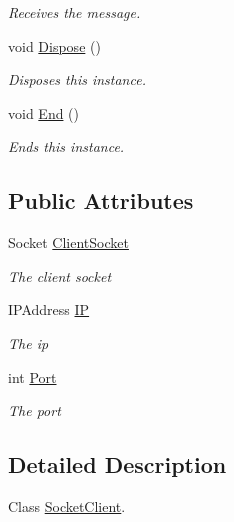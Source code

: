 \begin{DoxyCompactItemize}
\begin{DoxyCompactList}\small\item\em Receives the message. \end{DoxyCompactList}\item 
void \hyperlink{class_lerp2_a_p_i_1_1_communication_1_1_sockets_1_1_socket_client_a01746b5f397e6d746011b87f53931734}{Dispose} ()
\begin{DoxyCompactList}\small\item\em Disposes this instance. \end{DoxyCompactList}\item 
void \hyperlink{class_lerp2_a_p_i_1_1_communication_1_1_sockets_1_1_socket_client_af1773e74c6de381d92db4b351e2cf4f8}{End} ()
\begin{DoxyCompactList}\small\item\em Ends this instance. \end{DoxyCompactList}\end{DoxyCompactItemize}
\subsection*{Public Attributes}
\begin{DoxyCompactItemize}
\item 
Socket \hyperlink{class_lerp2_a_p_i_1_1_communication_1_1_sockets_1_1_socket_client_a26a1105d78296f8e171ca0a393f699ae}{Client\+Socket}
\begin{DoxyCompactList}\small\item\em The client socket \end{DoxyCompactList}\item 
I\+P\+Address \hyperlink{class_lerp2_a_p_i_1_1_communication_1_1_sockets_1_1_socket_client_a588ac7c903b57397a5c7d7b28a510c44}{IP}
\begin{DoxyCompactList}\small\item\em The ip \end{DoxyCompactList}\item 
int \hyperlink{class_lerp2_a_p_i_1_1_communication_1_1_sockets_1_1_socket_client_a590a0834d3c7869dfa6661a4eb6c2e9b}{Port}
\begin{DoxyCompactList}\small\item\em The port \end{DoxyCompactList}\end{DoxyCompactItemize}


\subsection{Detailed Description}
Class \hyperlink{class_lerp2_a_p_i_1_1_communication_1_1_sockets_1_1_socket_client}{Socket\+Client}. 



